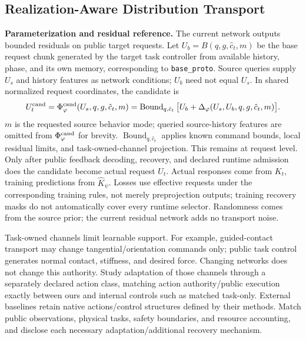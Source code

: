 \documentclass[11pt]{article}
\begin{document}
\subsection{Realization-Aware Distribution Transport}
\label{sec:transport}
\textbf{Parameterization and residual reference.} The current network outputs bounded
residuals on public target requests. Let $U_b=B(q,g,\hat c_t,m)$ be the base request
chunk generated by the target task controller from available history, phase, and its
own memory, corresponding to \texttt{base\_proto}. Source queries supply $U_s$ and
history features as network conditions; $U_b$ need not equal $U_s$. In shared normalized
request coordinates, the candidate is
\begin{equation}
 U_t^{\rm cand}=\Phi^{\rm cand}_\varphi(U_s,q,g,\hat c_t,m)
 =\operatorname{Bound}_{q,\hat c_t}
   \big[U_b+\Delta_\varphi(U_s,U_b,q,g,\hat c_t,m)\big].
 \label{eq:residual}
\end{equation}
$m$ is the requested source behavior mode; queried source-history features are omitted
from $\Phi^{\rm cand}_\varphi$ for brevity. $\operatorname{Bound}_{q,\hat c_t}$ applies
known command bounds, local residual limits, and task-owned-channel projection. This
remains at request level. Only after public feedback decoding, recovery, and declared
runtime admission does the candidate become actual request $U_t$. Actual responses
come from $K_t$, training predictions from $\widehat K_\psi$. Losses use effective
requests under the corresponding training rules, not merely preprojection outputs;
training recovery masks do not automatically cover every runtime selector. Randomness
comes from the source prior; the current residual network adds no transport noise.

Task-owned channels limit learnable support. For example, guided-contact transport
may change tangential/orientation commands only; public task control generates normal
contact, stiffness, and desired force. Changing networks does not change this authority.
Study adaptation of those channels through a separately declared action class, matching
action authority/public execution exactly between ours and internal controls such as
matched task-only. External baselines retain native actions/control structures defined
by their methods. Match public observations, physical tasks, safety boundaries, and
resource accounting, and disclose each necessary adaptation/additional recovery mechanism.
\end{document}
